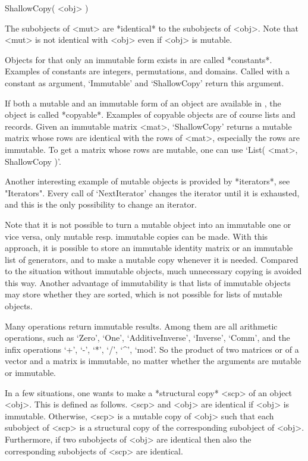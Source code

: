 \>ShallowCopy( <obj> )

The subobjects of <mut> are *identical* to the subobjects of <obj>.
Note that <mut> is not identical with <obj> even if <obj> is mutable.

Objects for that only an immutable form exists in {\GAP}
are called *constants*.
Examples of constants are integers, permutations, and domains.
Called with a constant as argument,
`Immutable' and `ShallowCopy' return this argument.

If both a mutable and an immutable form of an object are available in
{\GAP}, the object is called *copyable*.
Examples of copyable objects are of course lists and records.
Given an immutable matrix <mat>,
`ShallowCopy' returns a mutable matrix whose rows are identical with the
rows of <mat>,
especially the rows are immutable.
To get a matrix whose rows are mutable,
one can use `List( <mat>, ShallowCopy )'.

Another interesting example of mutable objects is provided by
*iterators*, see "Iterators".
Every call of `NextIterator' changes the iterator until it is exhausted,
and this is the only possibility to change an iterator.

Note that it is not possible to turn a mutable object into an immutable
one or vice versa,
only mutable resp. immutable copies can be made.
With this approach,
it is possible to store an immutable identity matrix
or an immutable list of generators,
and to make a mutable copy whenever it is needed.
Compared to the situation without immutable objects,
much unnecessary copying is avoided this way.
Another advantage of immutability is
that lists of immutable objects may store whether they are sorted,
which is not possible for lists of mutable objects.

Many operations return immutable results.
Among them are all arithmetic operations,
such as `Zero', `One', `AdditiveInverse', `Inverse', `Comm',
and the infix operations `+', `-', `*', `/', `^', `mod'.
So the product of two matrices or of a vector and a matrix is immutable,
no matter whether the arguments are mutable or immutable.

In a few situations,
one wants to make a *structural copy* <scp> of an object <obj>.
This is defined as follows.
<scp> and <obj> are identical if <obj> is immutable.
Otherwise, <scp> is a mutable copy of <obj> such that
each subobject of <scp> is a structural copy of the corresponding
subobject of <obj>.
Furthermore, if two subobjects of <obj> are identical then
also the corresponding subobjects of <scp> are identical. 

